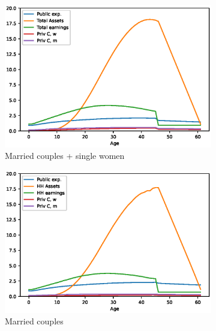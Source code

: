 \documentclass[]{article}
\begin{document}
\begin{figure}[H]
	\centering
	\begin{subfigure}{0.49\textwidth} %
		\centering
		\includegraphics[width=\textwidth]{lifecycle_aggregate.eps} %
		\caption{Married couples + single women}
		\label{fig:picture1}
	\end{subfigure}
	\begin{subfigure}{0.49\textwidth}
		\centering
		\includegraphics[width=\textwidth]{lifecycle_married.eps} %
		\caption{Married couples}
		\label{fig:picture2}
	\end{subfigure}
	\begin{subfigure}{0.49\textwidth}
		\centering

\end{subfigure}
\end{figure}
\end{document}
